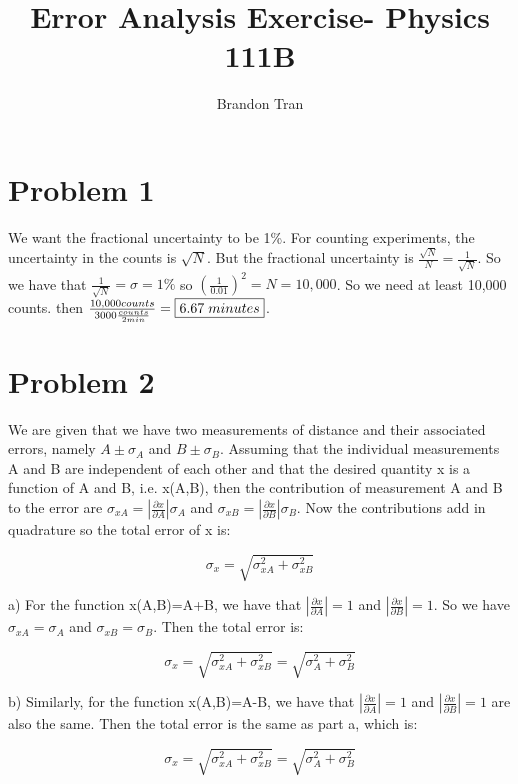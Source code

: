 \documentclass{article}
\begin{document}
\title{Error Analysis Exercise- Physics 111B}
\author{Brandon Tran}
 
\maketitle


\section*{Problem 1}
We want the fractional uncertainty to be 1\%. For counting experiments, the uncertainty in the counts is $\sqrt{N}$. But the fractional uncertainty is $\frac{\sqrt{N}}{N}=\frac{1}{\sqrt{N}}$. So we have that $\frac{1}{\sqrt{N}}=\sigma=1\%$ so $(\frac{1}{0.01})^2=N=10,000$. So we need at least 10,000 counts. then $\frac{10,000 counts}{3000 \frac{counts}{2 min} }= \boxed{6.67\hspace{1mm}minutes}$. 

\section*{Problem 2}
We are given that we have two measurements of distance and their associated errors, namely $A\pm\sigma_A$ and $B\pm\sigma_B$. Assuming that the individual measurements A and B are independent of each other and that the desired quantity x is a function of A and B, i.e. x(A,B), then the contribution of measurement A and B to the error are $\sigma_{xA}=|\frac{\partial x} {\partial A}|\sigma_A$ and $\sigma_{xB}=|\frac{\partial x} {\partial B}|\sigma_B$. Now the contributions add in quadrature so the total error of x is:

\[ \sigma_x=\sqrt{\sigma_{xA}^2+\sigma_{xB}^2}\] 

\noindent a) For the function x(A,B)=A+B, we have that $|\frac{\partial x} {\partial A}|=1$ and $|\frac{\partial x}{\partial B}|=1$. So we have $\sigma_{xA}=\sigma_A$ and $\sigma_{xB}=\sigma_B$. Then the total error is:

\[ \sigma_x=\sqrt{\sigma_{xA}^2+\sigma_{xB}^2}=\boxed{\sqrt{\sigma_{A}^2+\sigma_{B}^2}}\] 

\noindent b) Similarly, for the function x(A,B)=A-B, we have that $|\frac{\partial x} {\partial A}|=1$ and $|\frac{\partial x}{\partial B}|=1$ are also the same. Then the total error is the same as part a, which is:

\[ \sigma_x=\sqrt{\sigma_{xA}^2+\sigma_{xB}^2}=\boxed{\sqrt{\sigma_{A}^2+\sigma_{B}^2}}\] 
\end{document}
